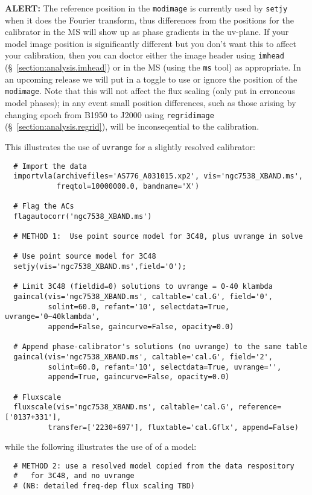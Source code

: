{{\bf ALERT:} The reference position in the {\tt modimage} is 
currently used by {\tt setjy} when it does the Fourier transform,
thus differences from the positions for the calibrator in the MS
will show up as phase gradients in the uv-plane.  If your model
image position is significantly different but you don't want this
to affect your calibration, then you can doctor either the image
header using {\tt imhead} (\S~\ref{section:analysis.imhead})
or in the MS (using the {\tt ms} tool) as appropriate.  In an upcoming
release we will put in a toggle to use or ignore the position of
the {\tt modimage}.  Note that this will not affect the flux scaling
(only put in erroneous model phases); in any event small position
differences, such as those arising by changing epoch from B1950 to
J2000 using {\tt regridimage} (\S~\ref{section:analysis.regrid}),
will be inconseqential to the calibration.

This illustrates the use of {\tt uvrange} for a slightly resolved 
calibrator:
\small
\begin{verbatim}
  # Import the data
  importvla(archivefiles='AS776_A031015.xp2', vis='ngc7538_XBAND.ms',
            freqtol=10000000.0, bandname='X')

  # Flag the ACs
  flagautocorr('ngc7538_XBAND.ms')

  # METHOD 1:  Use point source model for 3C48, plus uvrange in solve

  # Use point source model for 3C48
  setjy(vis='ngc7538_XBAND.ms',field='0');

  # Limit 3C48 (fieldid=0) solutions to uvrange = 0-40 klambda
  gaincal(vis='ngc7538_XBAND.ms', caltable='cal.G', field='0',
          solint=60.0, refant='10', selectdata=True, uvrange='0~40klambda', 
          append=False, gaincurve=False, opacity=0.0)

  # Append phase-calibrator's solutions (no uvrange) to the same table
  gaincal(vis='ngc7538_XBAND.ms', caltable='cal.G', field='2', 
          solint=60.0, refant='10', selectdata=True, uvrange='', 
          append=True, gaincurve=False, opacity=0.0)

  # Fluxscale
  fluxscale(vis='ngc7538_XBAND.ms', caltable='cal.G', reference=['0137+331'],
          transfer=['2230+697'], fluxtable='cal.Gflx', append=False)
\end{verbatim}
\normalsize
while the following illustrates the use of of a model:
\small
\begin{verbatim}
  # METHOD 2: use a resolved model copied from the data respository
  #   for 3C48, and no uvrange
  # (NB: detailed freq-dep flux scaling TBD)


\end{verbatim}}
